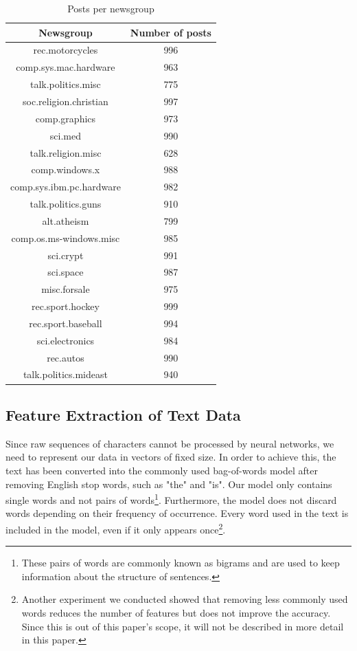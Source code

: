 \documentclass[sigconf]{acmart}
\begin{document}
\begin{table}[]
	\centering
	\caption{Posts per newsgroup}
	\label{tab:groups}
	\begin{tabular}{c|c}
		\hline
		       Newsgroup         & Number of posts \\ \hline
		    rec.motorcycles      &       996       \\
		 comp.sys.mac.hardware   &       963       \\
		   talk.politics.misc    &       775       \\
		 soc.religion.christian  &       997       \\
		     comp.graphics       &       973       \\
		        sci.med          &       990       \\
		   talk.religion.misc    &       628       \\
		     comp.windows.x      &       988       \\
		comp.sys.ibm.pc.hardware &       982       \\
		   talk.politics.guns    &       910       \\
		      alt.atheism        &       799       \\
		comp.os.ms-windows.misc  &       985       \\
		       sci.crypt         &       991       \\
		       sci.space         &       987       \\
		      misc.forsale       &       975       \\
		    rec.sport.hockey     &       999       \\
		   rec.sport.baseball    &       994       \\
		    sci.electronics      &       984       \\
		       rec.autos         &       990       \\
		 talk.politics.mideast   &       940
	\end{tabular}
\end{table}

\subsection{Feature Extraction of Text Data}
\label{sec:feature}

Since raw sequences of characters cannot be processed by neural networks, we need to represent our data in vectors of fixed size. In order to achieve this, the text has been converted into the commonly used bag-of-words model after removing English stop words, such as "the" and "is". Our model only contains single words and not pairs of words\footnote{These pairs of words are commonly known as bigrams and are used to keep information about the structure of sentences.}. Furthermore, the model does not discard words depending on their frequency of occurrence. Every word used in the text is included in the model, even if it only appears once\footnote{Another experiment we conducted showed that removing less commonly used words reduces the number of features but does not improve the accuracy. Since this is out of this paper's scope, it will not be described in more detail in this paper.}.
\end{document}
